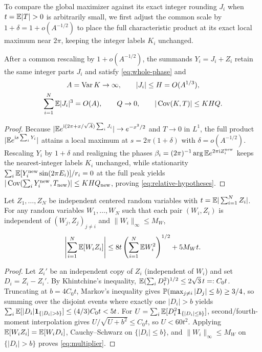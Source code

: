 To compare the global maximizer against its exact integer rounding $J_i$ when
$t=\E|T|>0$ is arbitrarily small, we first adjust the common scale by
$1+\delta=1+o(A^{-1/2})$ to place the full characteristic product at its exact
local maximum near $2\pi$, keeping the integer labels $K_i$ unchanged.

\begin{lemma}\label{lem:full-peak}
After a common rescaling by $1+o(A^{-1/2})$, the summands $Y_i=J_i+Z_i$
retain the same integer parts $J_i$ and satisfy \eqref{eq:whole-phase} and
\begin{equation}\label{eq:relative-hypotheses}
\begin{gathered}
 A=\operatorname{Var} K\to\infty,\qquad |J_i|\le H=O(A^{1/3}),\\
 \sum_{i=1}^N\mathbb E|J_i|^3=O(A),\qquad Q\to0,\qquad
                 |\operatorname{Cov}(K,T)|\le KHQ.
\end{gathered}
\end{equation}
\end{lemma}
\begin{proof}
Because $|\mathbb E e^{\mathrm i(2\pi+x/\sqrt A)\sum_i J_i}|\to e^{-x^2/2}$ and $T\to0$ in
$L^1$, the full product $|\mathbb E e^{\mathrm i s\sum_i Y_i}|$ attains a local maximum at
$s=2\pi(1+\delta)$ with $\delta=o(A^{-1/2})$. Rescaling $Y_i$ by $1+\delta$
and realigning the phases $\beta_i=(2\pi)^{-1}\arg\mathbb E e^{2\pi\mathrm i Z_i^{\rm new}}$
keeps the nearest-integer labels $K_i$ unchanged, while stationarity
$\sum_i\mathbb E[Y_i^{\rm new}\sin(2\pi E_i)]/r_i=0$ at the full peak yields
$|\operatorname{Cov}(\sum_i Y_i^{\rm new},T_{\rm new})|\le KHQ_{\rm new}$, proving
\eqref{eq:relative-hypotheses}.
\end{proof}

\begin{lemma}[Multiplier bound in terms of $t=\E|\sum_i Z_i|$]\label{lem:multiplier}
Let $Z_1,\ldots,Z_N$ be independent centered random variables with
$t=\mathbb E|\sum_{i=1}^N Z_i|$. For any random variables $W_1,\ldots,W_N$ such that
each pair $(W_i,Z_i)$ is independent of $(W_j,Z_j)_{j\ne i}$ and
$\|W_i\|_\infty\le M_W$,
\begin{equation}\label{eq:multiplier}
 \left|\sum_{i=1}^N\mathbb E[W_iZ_i]\right|
       \le8t\left(\sum_{i=1}^N\mathbb E W_i^2\right)^{1/2}+5M_Wt.
\end{equation}
\end{lemma}
\begin{proof}
Let $Z_i'$ be an independent copy of $Z_i$ (independent of $W_i$) and set
$D_i=Z_i-Z_i'$. By Khintchine's inequality, $\mathbb E(\sum_i D_i^2)^{1/2}\le2\sqrt3\,t=:C_0t$.
Truncating at $b=4C_0t$, Markov's inequality gives
$\mathbb P(\max_{j\ne i}|D_j|\le b)\ge3/4$, so summing over the disjoint events
where exactly one $|D_i|>b$ yields $\sum_i\E[|D_i|\ind_{\{|D_i|>b\}}]\le(4/3)C_0t<5t$.
For $U=\sum_i\mathbb E[D_i^2\mathbf1_{\{|D_i|\le b\}}]$, second/fourth-moment
interpolation gives $U/\sqrt{U+b^2}\le C_0t$, so $U<60t^2$. Applying
$\mathbb E[W_iZ_i]=\mathbb E[W_iD_i]$, Cauchy--Schwarz on $\{|D_i|\le b\}$, and
$\|W_i\|_\infty\le M_W$ on $\{|D_i|>b\}$ proves \eqref{eq:multiplier}.
\end{proof}

